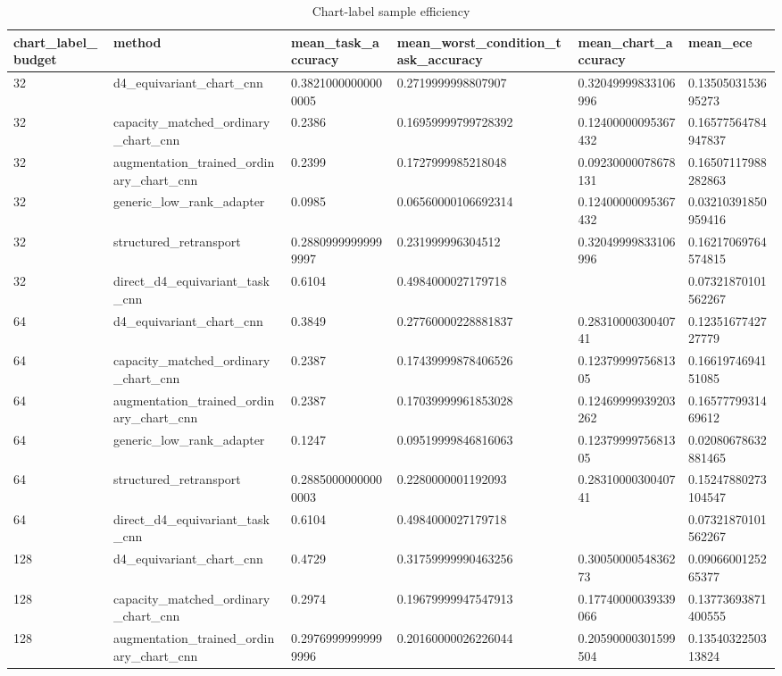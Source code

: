 \begin{table}[t]
\centering
\caption{Chart-label sample efficiency}
\begin{tabular}{llllll}
\toprule
chart\_label\_budget & method & mean\_task\_accuracy & mean\_worst\_condition\_task\_accuracy & mean\_chart\_accuracy & mean\_ece \\
\midrule
32 & d4\_equivariant\_chart\_cnn & 0.38210000000000005 & 0.2719999998807907 & 0.32049999833106996 & 0.1350503153695273 \\
32 & capacity\_matched\_ordinary\_chart\_cnn & 0.2386 & 0.16959999799728392 & 0.12400000095367432 & 0.16577564784947837 \\
32 & augmentation\_trained\_ordinary\_chart\_cnn & 0.2399 & 0.1727999985218048 & 0.09230000078678131 & 0.16507117988282863 \\
32 & generic\_low\_rank\_adapter & 0.0985 & 0.06560000106692314 & 0.12400000095367432 & 0.03210391850959416 \\
32 & structured\_retransport & 0.28809999999999997 & 0.231999996304512 & 0.32049999833106996 & 0.16217069764574815 \\
32 & direct\_d4\_equivariant\_task\_cnn & 0.6104 & 0.4984000027179718 &  & 0.07321870101562267 \\
64 & d4\_equivariant\_chart\_cnn & 0.3849 & 0.27760000228881837 & 0.2831000030040741 & 0.1235167742727779 \\
64 & capacity\_matched\_ordinary\_chart\_cnn & 0.2387 & 0.17439999878406526 & 0.1237999975681305 & 0.1661974694151085 \\
64 & augmentation\_trained\_ordinary\_chart\_cnn & 0.2387 & 0.17039999961853028 & 0.12469999939203262 & 0.1657779931469612 \\
64 & generic\_low\_rank\_adapter & 0.1247 & 0.09519999846816063 & 0.1237999975681305 & 0.02080678632881465 \\
64 & structured\_retransport & 0.28850000000000003 & 0.2280000001192093 & 0.2831000030040741 & 0.15247880273104547 \\
64 & direct\_d4\_equivariant\_task\_cnn & 0.6104 & 0.4984000027179718 &  & 0.07321870101562267 \\
128 & d4\_equivariant\_chart\_cnn & 0.4729 & 0.31759999990463256 & 0.3005000054836273 & 0.0906600125265377 \\
128 & capacity\_matched\_ordinary\_chart\_cnn & 0.2974 & 0.19679999947547913 & 0.17740000039339066 & 0.13773693871400555 \\
128 & augmentation\_trained\_ordinary\_chart\_cnn & 0.29769999999999996 & 0.20160000026226044 & 0.20590000301599504 & 0.1354032250313824 \\

\end{tabular}
\end{table}
